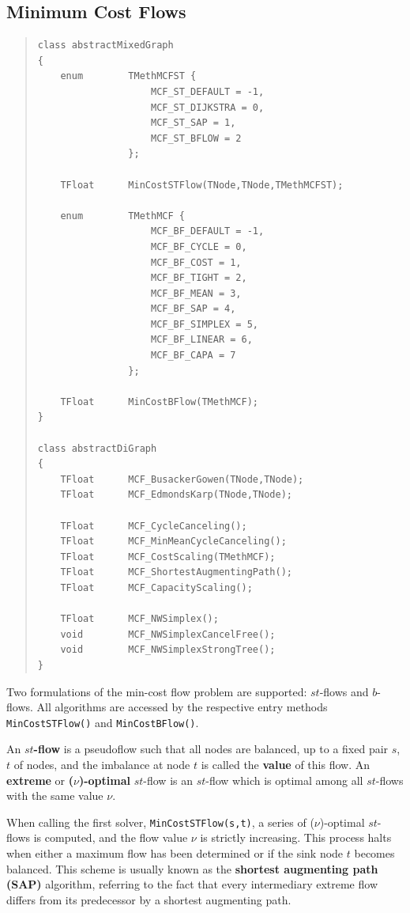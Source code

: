 \documentclass[a4paper,11pt,twoside]{book}
\begin{document}
\begin{multicols}{2}
\section{Minimum Cost Flows}
\label{slb_solve_mcflow}
\methods
\begin{quote}
\begin{verbatim}
class abstractMixedGraph
{
    enum        TMethMCFST {
                    MCF_ST_DEFAULT = -1,
                    MCF_ST_DIJKSTRA = 0,
                    MCF_ST_SAP = 1,
                    MCF_ST_BFLOW = 2
                };

    TFloat      MinCostSTFlow(TNode,TNode,TMethMCFST);

    enum        TMethMCF {
                    MCF_BF_DEFAULT = -1,
                    MCF_BF_CYCLE = 0,
                    MCF_BF_COST = 1,
                    MCF_BF_TIGHT = 2,
                    MCF_BF_MEAN = 3,
                    MCF_BF_SAP = 4,
                    MCF_BF_SIMPLEX = 5,
                    MCF_BF_LINEAR = 6,
                    MCF_BF_CAPA = 7
                };

    TFloat      MinCostBFlow(TMethMCF);
}

class abstractDiGraph
{
    TFloat      MCF_BusackerGowen(TNode,TNode);
    TFloat      MCF_EdmondsKarp(TNode,TNode);

    TFloat      MCF_CycleCanceling();
    TFloat      MCF_MinMeanCycleCanceling();
    TFloat      MCF_CostScaling(TMethMCF);
    TFloat      MCF_ShortestAugmentingPath();
    TFloat      MCF_CapacityScaling();

    TFloat      MCF_NWSimplex();
    void        MCF_NWSimplexCancelFree();
    void        MCF_NWSimplexStrongTree();
}
\end{verbatim}
\end{quote}
Two formulations of the min-cost flow problem are supported: $st$-flows and
$b$-flows. All algorithms are accessed by the respective entry methods
\verb/MinCostSTFlow()/ and \verb/MinCostBFlow()/.

An {\bf $st$-flow} is a pseudoflow such that all nodes are
balanced, up to a fixed pair $s$, $t$ of nodes, and the imbalance at node $t$
is called the {\bf value} of this flow.
An {\bf extreme} or {\bf ($\nu$)-optimal}
 $st$-flow is an $st$-flow which is optimal
among all $st$-flows with the same value $\nu$.

When calling the first solver, \verb/MinCostSTFlow(s,t)/, a series of
($\nu$)-optimal $st$-flows is computed, and the flow value $\nu$ is strictly
increasing. This process halts when either a maximum flow has been determined or
if the sink node $t$ becomes balanced. This scheme is usually known as the
{\bf shortest augmenting path (SAP)}  algorithm, referring
to the fact that every intermediary extreme flow differs from its predecessor
by a shortest augmenting path.


\end{multicols}
\end{document}
